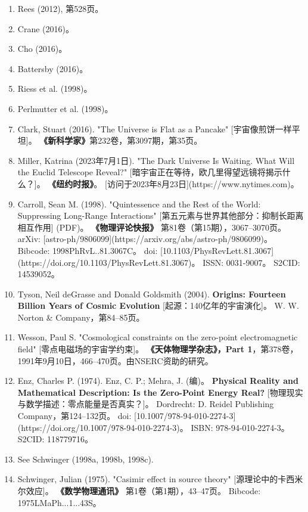 \begin{enumerate}
\item Rees (2012), 第528页。  
\item Crane (2016)。  
\item Cho (2016)。  
\item Battersby (2016)。  
\item Riess et al. (1998)。  
\item Perlmutter et al. (1998)。  
\item Clark, Stuart (2016). 
  "The Universe is Flat as a Pancake" [宇宙像煎饼一样平坦]。  
  \textbf{《新科学家》}第232卷，第3097期，第35页。  
\item Miller, Katrina (2023年7月1日). 
  "The Dark Universe Is Waiting. What Will the Euclid Telescope Reveal?" [暗宇宙正在等待，欧几里得望远镜将揭示什么？]。  
  \textbf{《纽约时报》}。  
  [访问于2023年8月23日](https://www.nytimes.com)。  
\item Carroll, Sean M. (1998).  
  "Quintessence and the Rest of the World: Suppressing Long-Range Interactions" [第五元素与世界其他部分：抑制长距离相互作用] (PDF)。  
  \textbf{《物理评论快报》} 第81卷（第15期），3067–3070页。  
  arXiv: [astro-ph/9806099](https://arxiv.org/abs/astro-ph/9806099)。  
  Bibcode: 1998PhRvL..81.3067C。  
  doi: [10.1103/PhysRevLett.81.3067](https://doi.org/10.1103/PhysRevLett.81.3067)。  
  ISSN: 0031-9007。  
  S2CID: 14539052。
\item Tyson, Neil deGrasse and Donald Goldsmith (2004).  
  \textbf{Origins: Fourteen Billion Years of Cosmic Evolution} [起源：140亿年的宇宙演化]。  
  W. W. Norton & Company，第84–85页。  
\item Wesson, Paul S.  
  "Cosmological constraints on the zero-point electromagnetic field" [零点电磁场的宇宙学约束]。  
  \textbf{《天体物理学杂志》，Part 1}，第378卷，1991年9月10日，466–470页。由NSERC资助的研究。  
\item Enz, Charles P. (1974).  
  Enz, C. P.; Mehra, J. (编)。  
  \textbf{Physical Reality and Mathematical Description: Is the Zero-Point Energy Real? }[物理现实与数学描述：零点能量是否真实？]。  
  Dordrecht: D. Reidel Publishing Company，第124–132页。  
  doi: [10.1007/978-94-010-2274-3](https://doi.org/10.1007/978-94-010-2274-3)。  
  ISBN: 978-94-010-2274-3。  
  S2CID: 118779716。  
\item See Schwinger (1998a, 1998b, 1998c). 
\item Schwinger, Julian (1975).  
  "Casimir effect in source theory" [源理论中的卡西米尔效应]。  
  \textbf{《数学物理通讯》} 第1卷（第1期），43–47页。  
  Bibcode: 1975LMaPh...1...43S。  

\end{enumerate}
